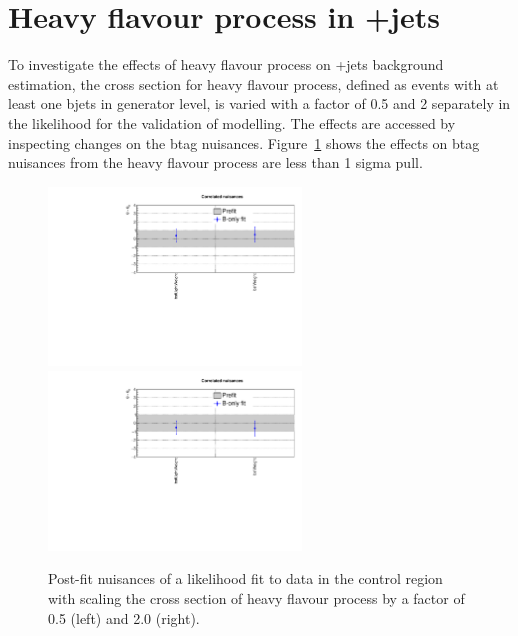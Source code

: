 
\section{Heavy flavour process in \znunu+jets}
\label{sec:zplusbb_app}

To investigate the effects of heavy flavour process on \znunu+jets 
background estimation, the cross section for heavy flavour process, 
defined as events with at least one bjets in generator level, is varied 
with a factor of 0.5 and 2 separately in the likelihood for the 
validation of \nb modelling. The effects are accessed by inspecting 
changes on the btag nuisances. Figure~\ref{fig:zplusbb} shows the effects 
on btag nuisances from the heavy flavour process are less than 1 sigma pull.

\begin{figure}[h!]
  \centering
  \includegraphics[width=0.6\textwidth]{figures/ZPlusbb/TemplateFitv1_HFXs0p5}
  \includegraphics[width=0.6\textwidth]{figures/ZPlusbb/TemplateFitv1_HFXs2p0}
  \caption{\label{fig:btagsfge1b} Post-fit nuisances of a likelihood
    fit to data in the \mmj control region with scaling the cross section of heavy 
    flavour process by a factor of 0.5 (left) and 2.0 (right). }
  \label{fig:zplusbb}
\end{figure}

